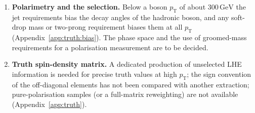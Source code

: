 \documentclass[11pt]{article}
\newcommand{\pt}{p_{\mathrm{T}}}
\newcommand{\GeV}{\ensuremath{\,\mathrm{GeV}}}
\begin{document}
\begin{enumerate}
  slightly more than the jet axis, which sensitivity alone cannot justify (Appendix~\ref{app:axes:results}). The choice
  among them is open, as is the decision to run the charge- and energy-weighted observables.
\item \textbf{Polarimetry and the selection.} Below a boson $\pt$ of about $300\GeV$ the jet requirements bias the
  decay angles of the hadronic boson, and any soft-drop mass or two-prong requirement biases them at all $\pt$
  (Appendix~\ref{app:truth:bias}). The phase space and the use of groomed-mass requirements for a polarisation measurement
  are to be decided.
\item \textbf{Truth spin-density matrix.} A dedicated production of unselected LHE information is needed for precise
  truth values at high $\pt$; the sign convention of the off-diagonal elements has not been compared with another
  extraction; pure-polarisation samples (or a full-matrix reweighting) are not available
  (Appendix~\ref{app:truth}).
\end{enumerate}

\appendix




\printbibliography[heading=bibintoc]
\end{document}
